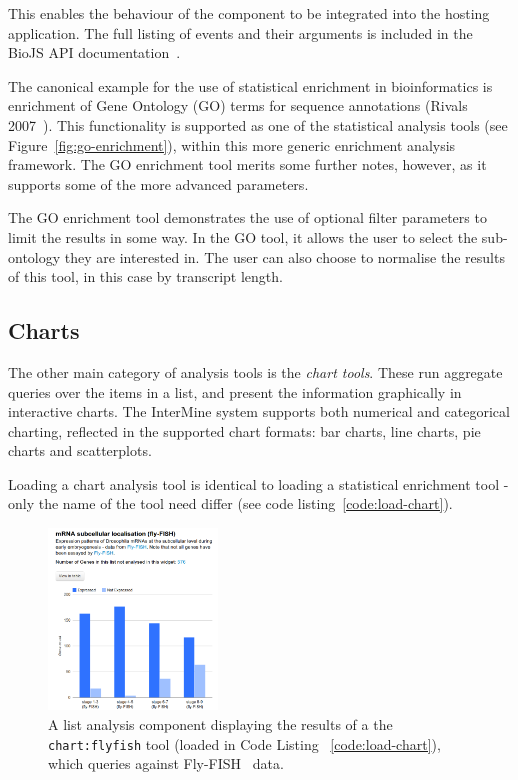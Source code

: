 \documentclass[10pt,a4paper,twocolumn]{article}
\begin{document}
This enables the behaviour of the component to be integrated into
the hosting application. The full listing of events and their arguments is
included in the BioJS API documentation~\cite{site:biojs-doc}.

The canonical example for the use of statistical enrichment in bioinformatics is
enrichment of Gene Ontology (GO) terms for sequence annotations (Rivals
2007~\cite{rivals}). This functionality is supported as one of the statistical
analysis tools (see Figure~\ref{fig:go-enrichment}), within this more generic
enrichment analysis framework. The GO enrichment tool merits some further notes,
however, as it supports some of the more advanced parameters.

The GO enrichment tool demonstrates the use of optional filter parameters to
limit the results in some way. In the GO tool, it allows the user to select the
sub-ontology they are interested in. The user can also choose to normalise the
results of this tool, in this case by transcript length. 

\subsection*{Charts}

The other main category of analysis tools is the \emph{chart tools}. These run
aggregate queries over the items in a list, and present the information
graphically in interactive charts. The InterMine system supports both numerical
and categorical charting, reflected in the supported chart formats: bar charts,
line charts, pie charts and scatterplots.

Loading a chart analysis tool is identical to loading a statistical enrichment
tool - only the name of the tool need differ (see code
listing~\ref{code:load-chart}).

\begin{figure}
\centering
\includegraphics[width=0.4\textwidth]{im-widgets-flyfish.png}
\caption{
    \label{fig:flyfish}
    A list analysis component displaying the results of a the \texttt{chart:flyfish}
    tool (loaded in Code Listing ~\ref{code:load-chart}), which queries against
    Fly-FISH~\cite{flyfish} data.
}
\end{figure}
\end{document}
